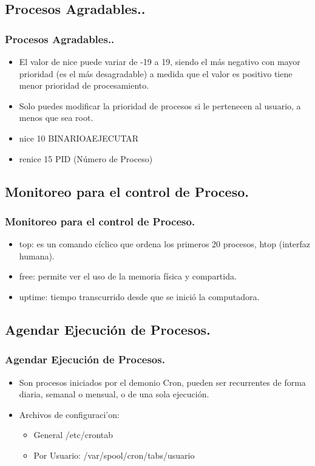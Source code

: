 \documentclass{beamer}
\begin{document}
\subsection{Procesos Agradables..}
\begin{frame}
\frametitle{Procesos Agradables..}
\begin{itemize}
\item El valor de nice puede variar de -19 a 19, siendo el m\'as negativo con mayor prioridad (es el m\'as desagradable) a medida que el valor es positivo tiene menor prioridad de procesamiento.
\item Solo puedes modificar la prioridad de procesos si le pertenecen al usuario, a menos que sea root.
\item nice 10 BINARIOAEJECUTAR
\item renice 15 PID (N\'umero de Proceso)
\end{itemize}
\end{frame}

\subsection{ Monitoreo para el control de Proceso.}
\begin{frame}
\frametitle{Monitoreo para el control de Proceso.}
\begin{itemize}
\item top: es un comando c\'iclico que ordena los primeros 20 procesos, htop (interfaz humana).
\item free: permite ver el uso de la memoria f\'isica y compartida.
\item uptime: tiempo transcurrido desde que se inici\'o la computadora. 
\end{itemize}
\end{frame}

\subsection{Agendar Ejecuci\'on de Procesos.}
\begin{frame}
\frametitle{Agendar Ejecuci\'on de Procesos.}
\begin{itemize}
\item Son procesos iniciados por el demonio Cron, pueden ser recurrentes de forma diaria, semanal o mensual, o de una sola ejecuci\'on.
\item Archivos de configuraci'on:
	\begin{itemize}
	\item General /etc/crontab
	\item Por Usuario: /var/spool/cron/tabs/usuario
	\end{itemize}
\end{itemize}
\end{frame}
\end{document}
